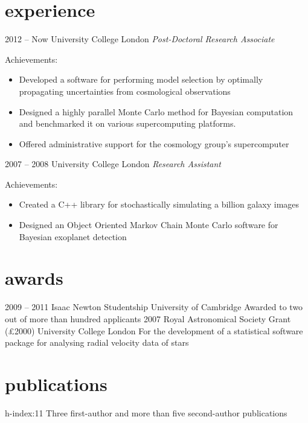 \documentclass[]{friggeri-cv}
\begin{document}
    \section{experience}
        \begin{entrylist}
            \entry
            {2012 -- Now}
            {University College London}
            {\emph{Post-Doctoral Research Associate}}
            {Achievements:
            \begin{itemize}
                \item Developed a software for performing model selection by optimally propagating uncertainties from cosmological observations
                \item Designed a highly parallel Monte Carlo method for Bayesian computation and benchmarked it on
            various supercomputing platforms.
                \item Offered administrative support for the cosmology group's supercomputer
            \end{itemize}}
            \entry
            {2007 -- 2008}
            {University College London}
            {\emph{Research Assistant}}
            {Achievements:
            \begin{itemize}
                \item Created a C++ library for stochastically simulating a billion galaxy images
                \item Designed an Object Oriented Markov Chain Monte Carlo software for Bayesian exoplanet detection
            \end{itemize}}
        \end{entrylist}

    \section{awards}
        \begin{entrylist}
            \entry
            {2009 -- 2011}
            {Isaac Newton Studentship}
            {University of Cambridge}
            {Awarded to two out of more than hundred applicants}
            \entry
            {2007}
            {Royal Astronomical Society Grant (£2000)}
            {University College London}
            {For the development of a statistical software package for analysing radial velocity data of stars}
        \end{entrylist}

    \section{publications}
        \begin{entrylist}
            \entry
            {h-index:11}
            {Three first-author and more than five second-author publications}
            {}
            {}
        \end{entrylist}
\end{document}

